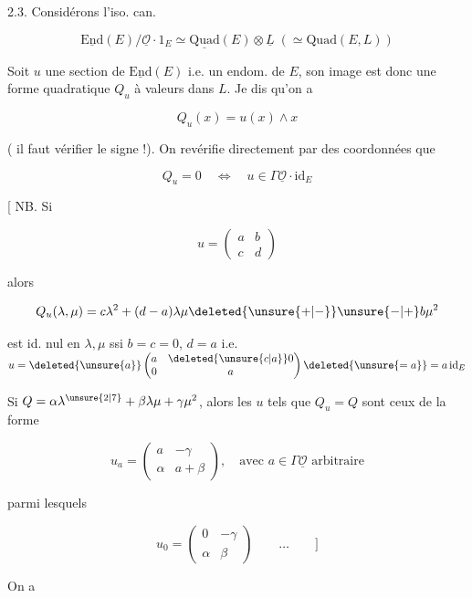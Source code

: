 
2.3. Considérons  l'iso. can.

\[
\underline{\mathrm{End}}(E)/\underline{\mathcal O}\cdot1_E\simeq\underline{\mathrm{Quad}}(E)\otimes\underline L\;(\simeq\mathrm{Quad}(E,L))
\]

Soit $u$ une section de $\underline{\mathrm{End}}(E)$ i.e. un endom. de $E$,  son image est donc une forme quadratique $Q_u$ à valeurs dans $L$. Je dis qu'on a

\[
\boxed{Q_u(x)=u(x)\wedge x}
\]

( il faut vérifier le signe !).  On revérifie directement par des coordonnées que

\[
Q_u=0\quad\Longleftrightarrow\quad u\in\Gamma\underline{\mathcal O}\cdot\mathrm{id}_E
\]

[ NB. Si

\[
u=\begin{pmatrix}a&b\\c&d\end{pmatrix}
\]

alors

\[
Q_u(\lambda,\mu)=c\lambda^2+(d-a)\lambda\mu\deleted{\unsure{+|-}}\unsure{-|+}b\mu^2
\]

 est id. nul en $\lambda,\mu$ ssi $b=c=0$, $d=a$ i.e. $u=\deleted{\unsure{a}}\begin{pmatrix}a&\deleted{\unsure{c|a}}0\\0&a\end{pmatrix}\deleted{\unsure{=a}}=a\,\mathrm{id}_E$

Si $Q=\alpha\lambda^{\unsure{2|7}}+\beta\lambda\mu+\gamma\mu^2$, alors les $u$ tels que $Q_u=Q$ sont ceux de la forme

\[
u_a=\begin{pmatrix}a&-\gamma\\\alpha&a+\beta\end{pmatrix},\quad\text{avec }a\in\Gamma\underline{\mathcal O}\text{ arbitraire}
\]

parmi lesquels

\[
u_0=\begin{pmatrix}0&-\gamma\\\alpha&\beta\end{pmatrix}\qquad\ldots\qquad]
\]

On a 
